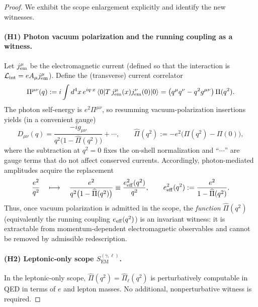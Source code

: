 \documentclass[11pt]{article}
\theoremstyle{remark}
\newcommand{\EM}{\ensuremath{\mathrm{EM}}}
\begin{document}
\begin{proof}
We exhibit the scope enlargement explicitly and identify the new witnesses.

\paragraph{(H1) Photon vacuum polarization and the running coupling as a witness.}
Let $j_{\rm em}^\mu$ be the electromagnetic current (defined so that the interaction is $\mathcal{L}_{\rm int}=e A_\mu j_{\rm em}^\mu$).
Define the (transverse) current correlator
\begin{equation}\label{eq:Pi-def}
\Pi^{\mu\nu}(q):= i\int d^4x\,e^{iq\cdot x}\,\langle 0|T\,j_{\rm em}^\mu(x)j_{\rm em}^\nu(0)|0\rangle
=\big(q^\mu q^\nu-q^2 g^{\mu\nu}\big)\,\Pi(q^2).
\end{equation}
The photon self-energy is $e^2\Pi^{\mu\nu}$, so resumming vacuum-polarization insertions yields (in a convenient gauge)
\begin{equation}\label{eq:photon-resummed}
D_{\mu\nu}(q)=\frac{-ig_{\mu\nu}}{q^2\big(1-\widehat\Pi(q^2)\big)}+\cdots,
\qquad \widehat\Pi(q^2):=-e^2\big(\Pi(q^2)-\Pi(0)\big),
\end{equation}
where the subtraction at $q^2=0$ fixes the on-shell normalization and ``$\cdots$'' are gauge terms that do not affect conserved currents.
Accordingly, photon-mediated amplitudes acquire the replacement
\begin{equation}\label{eq:alpha-running}
\frac{e^2}{q^2}\quad\longmapsto\quad\frac{e^2}{q^2\big(1-\widehat\Pi(q^2)\big)}\equiv \frac{e^2_{\rm eff}(q^2)}{q^2},
\qquad e^2_{\rm eff}(q^2):=\frac{e^2}{1-\widehat\Pi(q^2)}.
\end{equation}
Thus, once vacuum polarization is admitted in the scope, the \emph{function} $\widehat\Pi(q^2)$ (equivalently the running coupling $e_{\rm eff}(q^2)$) is an invariant witness: it is extractable from momentum-dependent electromagnetic observables and cannot be removed by admissible redescription.

\paragraph{(H2) Leptonic-only scope $S_{\EM}^{(\gamma,\ell)}$.}
In the leptonic-only scope, $\widehat\Pi(q^2)=\widehat\Pi_{\ell}(q^2)$ is perturbatively computable in QED in terms of $e$ and lepton masses.
No additional, nonperturbative witness is required.


\end{proof}
\end{document}
